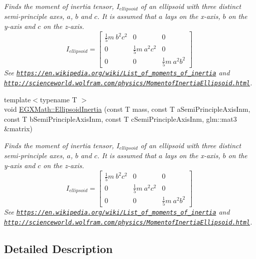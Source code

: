 \begin{DoxyCompactItemize}
\begin{DoxyCompactList}\small\item\em Finds the moment of inertia tensor, $I_{ellipsoid}$ of an ellipsoid with three distinct semi-\/principle axes, $a$, $b$ and $c$. It is assumed that $a$ lays on the x-\/axis, $b$ on the y-\/axis and $c$ on the z-\/axis. \[ I_{ellipsoid}=\begin{bmatrix} \frac{1}{5}m\ b^2c^2 & 0 & 0\\ 0 & \frac{1}{5}m\ a^2c^2 & 0\\ 0 & 0 & \frac{1}{5}m\ a^2b^2 \end{bmatrix} \] See \href{https://en.wikipedia.org/wiki/List_of_moments_of_inertia}{\tt https\+://en.\+wikipedia.\+org/wiki/\+List\+\_\+of\+\_\+moments\+\_\+of\+\_\+inertia} and \href{http://scienceworld.wolfram.com/physics/MomentofInertiaEllipsoid.html}{\tt http\+://scienceworld.\+wolfram.\+com/physics/\+Momentof\+Inertia\+Ellipsoid.\+html}. \end{DoxyCompactList}\item 
{\footnotesize template$<$typename T $>$ }\\void \mbox{\hyperlink{group___e_g_x_math-_geometry-3_d-_ellipsoid-_inertia_gaed602dd93a68fdd7d4bafe883b093153}{E\+G\+X\+Math\+::\+Ellipsoid\+Inertia}} (const T mass, const T a\+Semi\+Principle\+Axis\+Inm, const T b\+Semi\+Principle\+Axis\+Inm, const T c\+Semi\+Principle\+Axis\+Inm, glm\+::mat3 \&matrix)
\begin{DoxyCompactList}\small\item\em Finds the moment of inertia tensor, $I_{ellipsoid}$ of an ellipsoid with three distinct semi-\/principle axes, $a$, $b$ and $c$. It is assumed that $a$ lays on the x-\/axis, $b$ on the y-\/axis and $c$ on the z-\/axis. \[ I_{ellipsoid}=\begin{bmatrix} \frac{1}{5}m\ b^2c^2 & 0 & 0\\ 0 & \frac{1}{5}m\ a^2c^2 & 0\\ 0 & 0 & \frac{1}{5}m\ a^2b^2 \end{bmatrix} \] See \href{https://en.wikipedia.org/wiki/List_of_moments_of_inertia}{\tt https\+://en.\+wikipedia.\+org/wiki/\+List\+\_\+of\+\_\+moments\+\_\+of\+\_\+inertia} and \href{http://scienceworld.wolfram.com/physics/MomentofInertiaEllipsoid.html}{\tt http\+://scienceworld.\+wolfram.\+com/physics/\+Momentof\+Inertia\+Ellipsoid.\+html}. \end{DoxyCompactList}\end{DoxyCompactItemize}


\subsection{Detailed Description}


